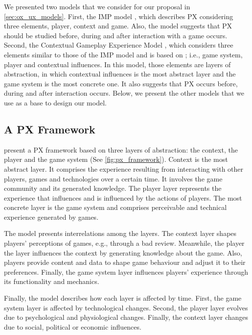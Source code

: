 We presented two models that we consider for our proposal in \autoref{sec:ox_ux_models}. First, the \ac{IMP} model \autocite{Elson2014}, which describes \ac{PX} considering three elements, player, context and game. Also, the model suggests that \ac{PX} should be studied before, during and after interaction with a game occurs. Second, the Contextual Gameplay Experience Model \autocite{Engl2013}, which considers three elements similar to those of the \ac{IMP} model and is based on \autocite{Nackea2,Nacked}; i.e., game system, player and contextual influences. In this model, those elements are layers of abstraction, in which contextual influences is the most abstract layer and the game system is the most concrete one. It also suggests that \ac{PX} occurs before, during and after interaction occurs. Below, we present the other models that we use as a base to design our model.

\subsection{A PX Framework}
\textcite{Nackea2} present a \ac{PX} framework based on three layers of abstraction: the context, the player and the game system (See \autoref{fig:px_framework}). Context is the most abstract layer. It comprises the experience resulting from interacting with other players, games and technologies over a certain time. It involves the game community and its generated knowledge. The player layer represents the experience that influences and is influenced by the actions of players. The most concrete layer is the game system and comprises perceivable and technical experience generated by games.

The model presents interrelations among the layers. The context layer shapes players' perceptions of games, e.g., through a bad review. Meanwhile, the player the layer influences the context by generating knowledge about the game. Also, players provide content and data to shape game behaviour and adjust it to their preferences. Finally, the game system layer influences players' experience through its functionality and mechanics.

Finally, the model describes how each layer is affected by time. First, the game system layer is affected by technological changes. Second, the player layer evolves due to psychological and physiological changes. Finally, the context layer changes due to social, political or economic influences.


